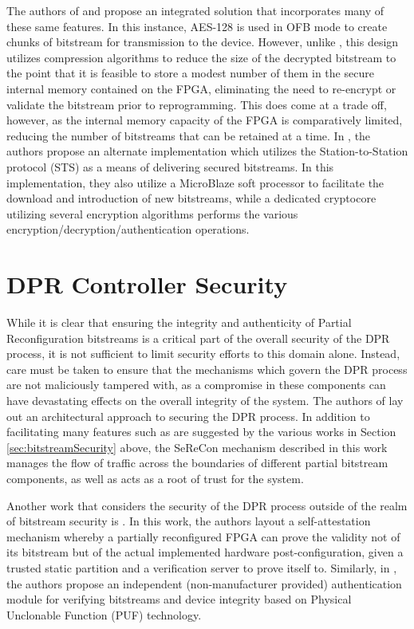 The authors of \cite{vliegen_single-chip_2013} and \cite{vliegen_partial_2014} propose an integrated solution that incorporates many of these same features. In this instance, AES-128 is used in OFB mode to create chunks of bitstream for transmission to the device. However, unlike \cite{hori_bitstream_2013}, this design utilizes compression algorithms to reduce the size of the decrypted bitstream to the point that it is feasible to store a modest number of them in the secure internal memory contained on the FPGA, eliminating the need to re-encrypt or validate the bitstream prior to reprogramming. This does come at a trade off, however, as the internal memory capacity of the FPGA is comparatively limited, reducing the number of bitstreams that can be retained at a time. In \cite{vliegen_secure_2014}, the authors propose an alternate implementation which utilizes the Station-to-Station protocol (STS) as a means of delivering secured bitstreams. In this implementation, they also utilize a MicroBlaze soft processor to facilitate the download and introduction of new bitstreams, while a dedicated cryptocore utilizing several encryption algorithms performs the various 
encryption/decryption/authentication operations.

\section{DPR Controller Security} \label{sec:DPRControllerSecurity} While it is clear that ensuring the integrity and authenticity of Partial Reconfiguration bitstreams is a critical part of the overall security of the DPR process, it is not sufficient to limit security efforts to this domain alone. Instead, care must be taken to ensure that the mechanisms which govern the DPR process are not maliciously tampered with, as a compromise in these components can have devastating effects on the overall integrity of the system. The authors of \cite{kepa_serecon_2010} lay out an architectural approach to securing the DPR process. In addition to facilitating many features such as are suggested by the various works in Section \ref{sec:bitstreamSecurity} above, the SeReCon mechanism described in this work manages the flow of traffic across the boundaries of different partial bitstream components, as well as acts as a root of trust for the system.

Another work that considers the security of the DPR process outside of the realm of bitstream security is \cite{vliegen_sacha_2019}. In this work, the authors layout a self-attestation mechanism whereby a partially reconfigured FPGA can prove the validity not of its bitstream but of the actual implemented hardware post-configuration, given a trusted static partition and a verification server to prove itself to. Similarly, in \cite{jacob_securing_2017}, the authors propose an independent (non-manufacturer provided) authentication module for verifying bitstreams and device integrity based on Physical Unclonable Function (PUF) technology.

